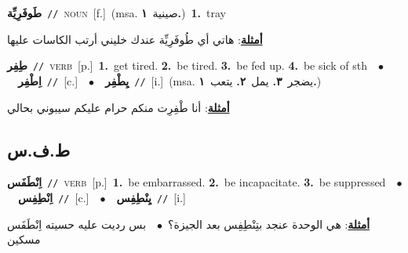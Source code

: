 \documentclass[10pt,a4paper,twoside]{article} %
\begin{document}
\begin{multicols}{2}
{\setlength\topsep{0pt}\textbf{\foreignlanguage{arabic}{طَوفَرِيِّة}}\ {\color{gray}\texttt{//}\color{black}}\ \textsc{noun}\ [f.]\ \color{gray}(msa. \foreignlanguage{arabic}{صينية}~\foreignlanguage{arabic}{\textbf{١.}})\color{black}\ \textbf{1.}~tray\  \begin{flushright}\color{gray}\foreignlanguage{arabic}{\textbf{\underline{\foreignlanguage{arabic}{أمثلة}}}: هاتي أي طُوفَرِيِّة عندك خليني أرتب الكاسات عليها}\end{flushright}\color{black}} \vspace{2mm}

{\setlength\topsep{0pt}\textbf{\foreignlanguage{arabic}{طِفِر}}\ {\color{gray}\texttt{//}\color{black}}\ \textsc{verb}\ [p.]\ \textbf{1.}~get tired.  \textbf{2.}~be tired.  \textbf{3.}~be fed up.  \textbf{4.}~be sick of sth\ \ $\bullet$\ \ \setlength\topsep{0pt}\textbf{\foreignlanguage{arabic}{اِطْفِر}}\ {\color{gray}\texttt{//}\color{black}}\ [c.]\ \ $\bullet$\ \ \setlength\topsep{0pt}\textbf{\foreignlanguage{arabic}{يِطْفِر}}\ {\color{gray}\texttt{//}\color{black}}\ [i.]\ \color{gray}(msa. \foreignlanguage{arabic}{يضجر}~\foreignlanguage{arabic}{\textbf{٣.}}  \foreignlanguage{arabic}{يمل}~\foreignlanguage{arabic}{\textbf{٢.}}  \foreignlanguage{arabic}{يتعب}~\foreignlanguage{arabic}{\textbf{١.}})\color{black}\  \begin{flushright}\color{gray}\foreignlanguage{arabic}{\textbf{\underline{\foreignlanguage{arabic}{أمثلة}}}: أنا طْفِرِت منكم حرام عليكم سيبوني بحالي}\end{flushright}\color{black}} \vspace{2mm}

\vspace{-3mm}
\subsection*{\color{blue}\foreignlanguage{arabic}{ط.ف.س}\color{blue}{}} 

{\setlength\topsep{0pt}\textbf{\foreignlanguage{arabic}{اِنْطَفَس}}\ {\color{gray}\texttt{//}\color{black}}\ \textsc{verb}\ [p.]\ \textbf{1.}~be embarrassed.  \textbf{2.}~be incapacitate.  \textbf{3.}~be suppressed\ \ $\bullet$\ \ \setlength\topsep{0pt}\textbf{\foreignlanguage{arabic}{اِنْطِفِس}}\ {\color{gray}\texttt{//}\color{black}}\ [c.]\ \ $\bullet$\ \ \setlength\topsep{0pt}\textbf{\foreignlanguage{arabic}{يِنْطِفِس}}\ {\color{gray}\texttt{//}\color{black}}\ [i.]\  \begin{flushright}\color{gray}\foreignlanguage{arabic}{\textbf{\underline{\foreignlanguage{arabic}{أمثلة}}}: هي الوحدة عنجد بتِنْطِفِس بعد الجيزة؟\ $\bullet$\ \  بس رديت عليه حسيته اِنْطَفَس مسكين}\end{flushright}\color{black}} \vspace{2mm}


\end{multicols}
\end{document}
